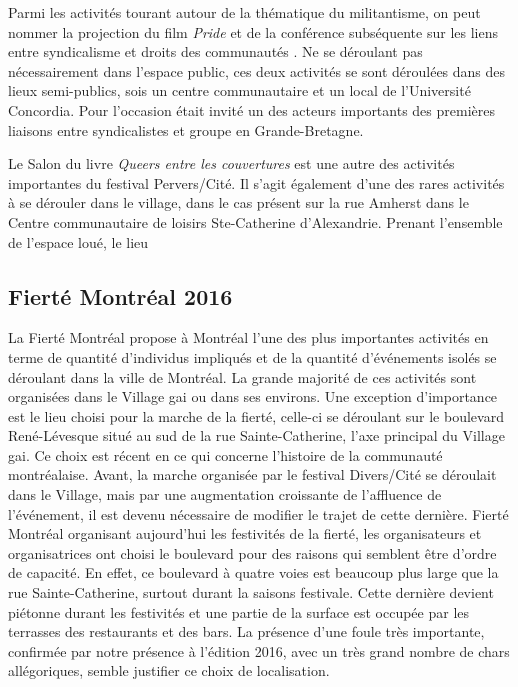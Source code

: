 Parmi les activités tourant autour de la thématique du militantisme, on peut nommer la projection du film \emph{Pride} et de la conférence subséquente sur les liens entre syndicalisme et droits des communautés \lgbt{}.
Ne se déroulant pas nécessairement dans l'espace public, ces deux activités se sont déroulées dans des lieux semi-publics, sois un centre communautaire et un local de l'Université Concordia.
Pour l'occasion était invité un des acteurs importants des premières liaisons entre syndicalistes et groupe \lgbt{} en Grande-Bretagne.

Le Salon du livre \emph{Queers entre les couvertures} est une autre des activités importantes du festival Pervers/Cité.
Il s'agit également d'une des rares activités à se dérouler dans le village, dans le cas présent sur la rue Amherst dans le Centre communautaire de loisirs Ste-Catherine d'Alexandrie.
Prenant l'ensemble de l'espace loué, le lieu
\subsection{Fierté Montréal 2016}
\label{subsec:fiertemontreal2016}
La Fierté Montréal propose à Montréal l'une des plus importantes activités \lgbt en terme de quantité d'individus impliqués et de la quantité d'événements isolés se déroulant dans la ville de Montréal.
La grande majorité de ces activités sont organisées dans le Village gai ou dans ses environs.
Une exception d'importance est le lieu choisi pour la marche de la fierté, celle-ci se déroulant sur le boulevard René-Lévesque situé au sud de la rue Sainte-Catherine, l'axe principal du Village gai.
Ce choix est récent en ce qui concerne l'histoire de la communauté \lgbt montréalaise.
Avant, la marche organisée par le festival Divers/Cité se déroulait dans le Village, mais par une augmentation croissante de l'affluence de l'événement, il est devenu nécessaire de modifier le trajet de cette dernière.
Fierté Montréal organisant aujourd'hui les festivités de la fierté, les organisateurs et organisatrices ont choisi le boulevard pour des raisons qui semblent être d'ordre de capacité.
En effet, ce boulevard à quatre voies est beaucoup plus large que la rue Sainte-Catherine, surtout durant la saisons festivale.
Cette dernière devient piétonne durant les festivités et une partie de la surface est occupée par les terrasses des restaurants et des bars.
La présence d'une foule très importante, confirmée par notre présence à l'édition 2016, avec un très grand nombre de chars allégoriques, semble justifier ce choix de localisation.


